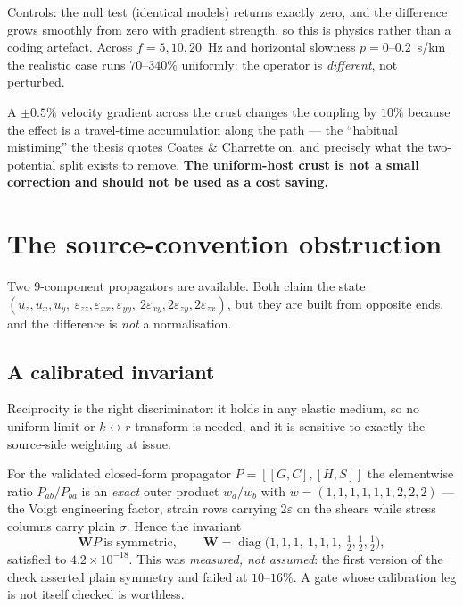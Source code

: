 \documentclass[11pt,a4paper]{article}
\newcommand{\bW}{\mathbf{W}}
\begin{document}
Controls: the null test (identical models) returns exactly zero, and the
difference grows smoothly from zero with gradient strength, so this is physics
rather than a coding artefact.  Across $f = 5,10,20$~Hz and horizontal slowness
$p = 0$--$0.2$~s/km the realistic case runs $70$--$340\%$ uniformly: the
operator is \emph{different}, not perturbed.

A $\pm0.5\%$ velocity gradient across the crust changes the coupling by $10\%$
because the effect is a travel-time accumulation along the path --- the
``habitual mistiming'' the thesis quotes Coates \& Charrette on, and precisely
what the two-potential split exists to remove.  \textbf{The uniform-host crust
is not a small correction and should not be used as a cost saving.}

\section{The source-convention obstruction}

Two 9-component propagators are available.  Both claim the state
$(u_z,u_x,u_y,\ \varepsilon_{zz},\varepsilon_{xx},\varepsilon_{yy},\
2\varepsilon_{xy},2\varepsilon_{zy},2\varepsilon_{zx})$, but they are built
from opposite ends, and the difference is \emph{not} a normalisation.

\subsection{A calibrated invariant}

Reciprocity is the right discriminator: it holds in any elastic medium, so no
uniform limit or $k\leftrightarrow r$ transform is needed, and it is sensitive
to exactly the source-side weighting at issue.

For the validated closed-form propagator $P = [[G,C],[H,S]]$ the elementwise
ratio $P_{ab}/P_{ba}$ is an \emph{exact} outer product $w_a/w_b$ with
$w = (1,1,1,1,1,1,2,2,2)$ --- the Voigt engineering factor, strain rows
carrying $2\varepsilon$ on the shears while stress columns carry plain
$\sigma$.  Hence the invariant
\begin{equation}\label{eq:Winv}
  \bW P \ \text{is symmetric},\qquad
  \bW = \operatorname{diag}\bigl(1,1,1,\ 1,1,1,\ \tfrac12,\tfrac12,\tfrac12\bigr),
\end{equation}
satisfied to $4.2\times10^{-18}$.  This was \emph{measured, not assumed}: the
first version of the check asserted plain symmetry and failed at $10$--$16\%$.
A gate whose calibration leg is not itself checked is worthless.
\end{document}
